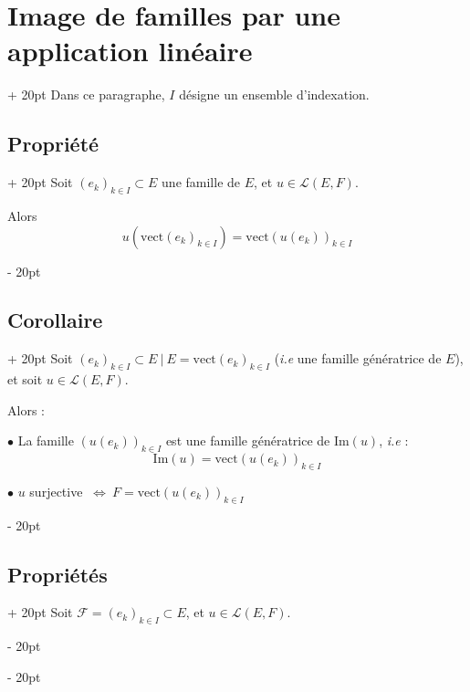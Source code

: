 \documentclass[a4paper, 12pt, twoside]{article}
\newcommand{\lr}[1]{\left( #1 \right)}
\newcommand{\ssi}{\ \Leftrightarrow \ }
\newcommand{\ind}[1][20pt]{\advance\leftskip + #1}
\newcommand{\deind}[1][20pt]{\advance\leftskip - #1}
\newenvironment{indt}[2][20pt]{#2 \par \ind[#1]}{\par \deind} %
\begin{document}
    \vspace{12pt}
    
    \begin{indt}{\section{Image de familles par une application linéaire}}
        Dans ce paragraphe, $I$ désigne un ensemble d'indexation.

        \begin{indt}{\subsection{Propriété}}
            Soit $(e_k)_{k \in I} \subset E$ une famille de $E$, et $u \in \mathcal L(E, F)$.

            Alors
            \[
                u\!\lr{\mathrm{vect}(e_k)_{k \in I }} = \mathrm{vect}\!\lr{u\!\lr{e_k}}_{k \in I}
            \]
        \end{indt}

        \vspace{12pt}
        
        \begin{indt}{\subsection{Corollaire}}
            Soit $(e_k)_{k \in I} \subset E\ |\ E = \mathrm{vect}(e_k)_{k \in I}$ (\textit{i.e} une famille génératrice de $E$), et soit $u \in \mathcal L(E, F)$.

            Alors :

            $\bullet$ La famille $(u(e_k))_{k \in I}$ est une famille génératrice de $\mathrm{Im}(u)$, \textit{i.e} :
            \[
                \mathrm{Im}(u) = \mathrm{vect}(u(e_k))_{k \in I}
            \]

            $\bullet$ $u$ surjective $\ssi F = \mathrm{vect}(u(e_k))_{k \in I}$
        \end{indt}

        \vspace{12pt}
        
        \begin{indt}{\subsection{Propriétés}}
            Soit $\mathcal F = (e_k)_{k \in I} \subset E$, et $u \in \mathcal L(E, F)$.


\end{indt}
\end{indt}
\end{document}
